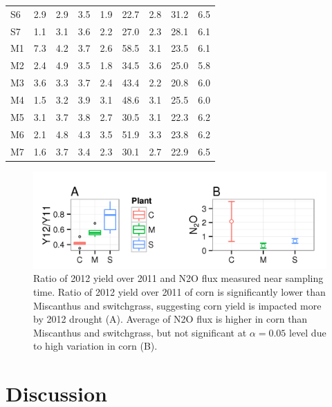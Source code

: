 \documentclass[]{msu-thesis}
\begin{document}
\begin{table}[htbp]
\begin{tabular}{|lcccccccc|}
    S6    & 2.9   & 2.9   & 3.5   & 1.9   & 22.7  & 2.8   & 31.2  & 6.5 \\
    S7    & 1.1   & 3.1   & 3.6   & 2.2   & 27.0  & 2.3   & 28.1  & 6.1 \\
    M1    & 7.3   & 4.2   & 3.7   & 2.6   & 58.5  & 3.1   & 23.5  & 6.1 \\
    M2    & 2.4   & 4.9   & 3.5   & 1.8   & 34.5  & 3.6   & 25.0  & 5.8 \\
    M3    & 3.6   & 3.3   & 3.7   & 2.4   & 43.4  & 2.2   & 20.8  & 6.0 \\
    M4    & 1.5   & 3.2   & 3.9   & 3.1   & 48.6  & 3.1   & 25.5  & 6.0 \\
    M5    & 3.1   & 3.7   & 3.8   & 2.7   & 30.5  & 3.1   & 22.3  & 6.2 \\
    M6    & 2.1   & 4.8   & 4.3   & 3.5   & 51.9  & 3.3   & 23.8  & 6.2 \\
    M7    & 1.6   & 3.7   & 3.4   & 2.3   & 30.1  & 2.7   & 22.9  & 6.5 \\
    \bottomrule
    \end{tabular}%
  \label{tab:chap4TabS6}%
\end{table}%

\begin{figure}[tbph!]
  \centering
  \includegraphics[scale=1]{figs/chap4-meta-n2o-yield-ratio}
  \caption[Ratio of 2012 yield over 2011 and N2O flux]{Ratio of 2012 yield over 2011 and N2O flux measured near sampling time. Ratio of 2012 yield over 2011 of corn is significantly lower than Miscanthus and switchgrass, suggesting corn yield is impacted more by 2012 drought (A). Average of N2O flux is higher in corn than Miscanthus and switchgrass, but not significant at $\alpha = 0.05$ level due to high variation in corn (B).}
  \label{fig:chap4FigS11}
\end{figure}


\section{Discussion}
\end{document}
